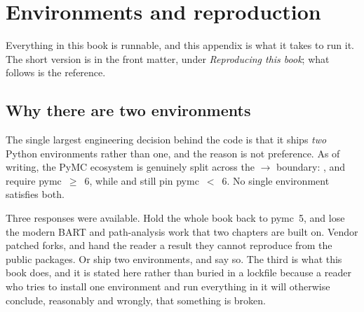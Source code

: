 %
%
\chapter{Environments and reproduction}
\label{app:env}

Everything in this book is runnable, and this appendix is what it takes to run it. The short
version is in the front matter, under \emph{Reproducing this book}; what follows is the
reference.

\section{Why there are two environments}
\label{app:env:split}

The single largest engineering decision behind the code is that it ships \emph{two} Python
environments rather than one, and the reason is not preference. As of writing, the PyMC ecosystem
is genuinely split across the  $\to$  boundary: ,
 and  require pymc~$\ge$~6, while  and
 still pin pymc~$<$~6. No single environment satisfies both.

Three responses were available. Hold the whole book back to pymc~5, and lose the modern BART and
path-analysis work that two chapters are built on. Vendor patched forks, and hand the reader a
result they cannot reproduce from the public packages. Or ship two environments, and say so. The
third is what this book does, and it is stated here rather than buried in a lockfile because a
reader who tries to install one environment and run everything in it will otherwise conclude,
reasonably and wrongly, that something is broken.

